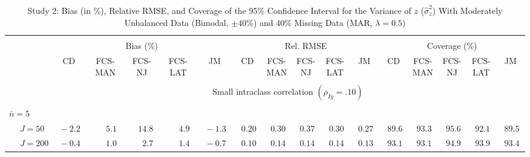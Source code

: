 \begin{sidewaystable}
\begin{threeparttable}
\setlength{\tabcolsep}{1.0pt}
\renewcommand{\arraystretch}{0.95}
\footnotesize
\caption{\small Study 2: Bias (in \%), Relative RMSE, and Coverage of the 95\% Confidence Interval for the Variance of $z$ ($\hat\sigma_z^2$) With Moderately Unbalanced Data (Bimodal, $\pm 40\%$) and 40\% Missing Data (MAR, $\lambda=0.5$)}
\begin{tabular}{llccccccccccccccc}
\hline\\[-1.8ex]
& & \multicolumn{5}{c}{Bias (\%)} & \multicolumn{5}{c}{Rel. RMSE} & \multicolumn{5}{c}{Coverage (\%)} \\ \cmidrule(r){3-7}\cmidrule(r){8-12}\cmidrule(r){13-17}
 &  & CD & \makecell{FCS-\\MAN} & \makecell{FCS-\\NJ} & \makecell{FCS-\\LAT} & JM & CD & \makecell{FCS-\\MAN} & \makecell{FCS-\\NJ} & \makecell{FCS-\\LAT} & JM & CD & \makecell{FCS-\\MAN} & \makecell{FCS-\\NJ} & \makecell{FCS-\\LAT} & \multicolumn{1}{c}{JM} \\ 
[0.4ex]\hline\\[-1.8ex]
& & \multicolumn{15}{c}{Small intraclass correlation $(\rho_{Iy}=.10)$} \\[0.6ex]\hline\\[-1.8ex]
\multicolumn{4}{l}{$\bar{n}=5$} \\  & \nopagebreak $\;J=50$  & $\phantom{0}{-}2.2\phantom{0}$ & $\phantom{0}\phantom{-}5.1\phantom{0}$ & $\phantom{-}14.8\phantom{0}$ & $\phantom{0}\phantom{-}4.9\phantom{0}$ & $\phantom{0}{-}1.3\phantom{0}$ & $\phantom{0}0.20\phantom{0}$ & $\phantom{0}0.30\phantom{0}$ & $\phantom{0}0.37\phantom{0}$ & $\phantom{0}0.30\phantom{0}$ & $\phantom{0}0.27\phantom{0}$ & $\phantom{0}89.6\phantom{0}$ & $\phantom{0}93.3\phantom{0}$ & $\phantom{0}95.6\phantom{0}$ & $\phantom{0}92.1\phantom{0}$ & $\phantom{0}89.5\phantom{0}$ \\
 & \nopagebreak $\;J=200$  & $\phantom{0}{-}0.4\phantom{0}$ & $\phantom{0}\phantom{-}1.0\phantom{0}$ & $\phantom{0}\phantom{-}2.7\phantom{0}$ & $\phantom{0}\phantom{-}1.4\phantom{0}$ & $\phantom{0}{-}0.7\phantom{0}$ & $\phantom{0}0.10\phantom{0}$ & $\phantom{0}0.14\phantom{0}$ & $\phantom{0}0.14\phantom{0}$ & $\phantom{0}0.14\phantom{0}$ & $\phantom{0}0.13\phantom{0}$ & $\phantom{0}93.1\phantom{0}$ & $\phantom{0}93.1\phantom{0}$ & $\phantom{0}94.9\phantom{0}$ & $\phantom{0}93.9\phantom{0}$ & $\phantom{0}93.4\phantom{0}$ \\

\end{tabular}
\end{threeparttable}
\end{sidewaystable}
